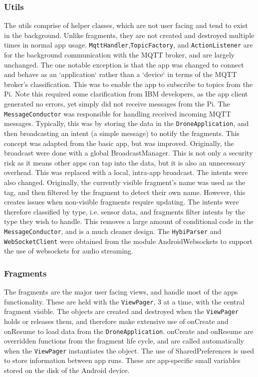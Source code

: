 \documentclass{article}
\begin{document}
\subsubsection{Utils}
The utils comprise of helper classes, which are not user facing and tend to exist in the background. Unlike fragments, they are not created and destroyed multiple times in normal app usage. \texttt{MqttHandler},\texttt{TopicFactory}, and \texttt{ActionListener} are for the background communication with the MQTT broker, and are largely unchanged. The one notable exception is that the app was changed to connect and behave as an `application` rather than a `device` in terms of the MQTT broker's classification. This was to enable the app to subscribe to topics from the Pi. Note this required some clarification from IBM developers, as the app client generated no errors, yet simply did not receive messages from the Pi\cite{githubTopicIssue}. The \texttt{MessageConductor} was responsible for handling received incoming MQTT messages. Typically, this was by storing the data in the \texttt{DroneApplication}, and then broadcasting an intent (a simple message) to notify the fragments. This concept was adapted from the basic app, but was improved. Originally, the broadcast were done with a global BroadcastManager. This is not only a security risk as it means other apps can tap into the data, but it is also an unnecessary overhead. This was replaced with a local, intra-app broadcast. The intents were also changed. Originally, the currently visible fragment's name was used as the tag, and then filtered by the fragment to detect their own name. However, this creates issues when non-visible fragments require updating. The intents were therefore classified by type, i.e. sensor data, and fragments filter intents by the type they wish to handle. This removes a large amount of conditional code in the \texttt{MessageConductor}, and is a much cleaner design. The \texttt{HybiParser} and \texttt{WebSocketClient} were obtained from the module AndroidWebsockets\cite{androidWebsockets} to support the use of websockets for audio streaming.

\subsubsection{Fragments}
The fragments are the major user facing views, and handle most of the apps functionality. These are held with the \texttt{ViewPager}, 3 at a time, with the central fragment visible. The objects are created and destroyed when the \texttt{ViewPager} holds or releases them, and therefore make extensive use of onCreate and onResume to load data from the \texttt{DroneApplication}. onCreate and onResume are overridden functions from the fragment life cycle, and are called automatically when the \texttt{ViewPager} instantiates the object. The use of SharedPreferences is used to store information between app runs. These are app-specific small variables stored on the disk of the Android device.
\end{document}
